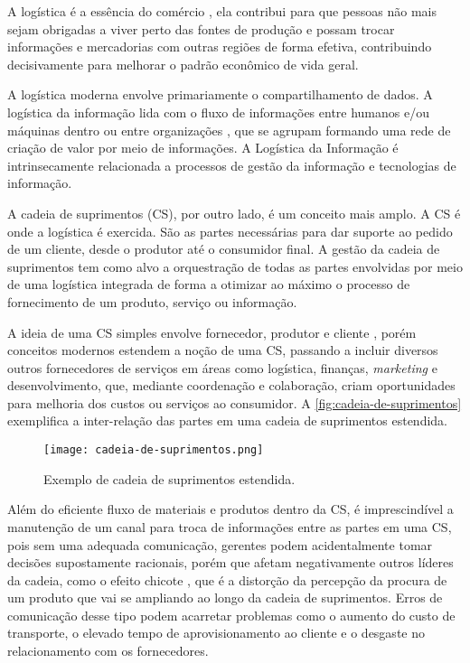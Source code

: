 	A logística é a essência do comércio \cite{ballou2006cadeiasuprimentos}, ela contribui para que pessoas não mais sejam obrigadas a viver perto das fontes de produção e possam trocar informações e mercadorias com outras regiões de forma efetiva, contribuindo decisivamente para melhorar o padrão econômico de vida geral. 
	
	A logística moderna envolve primariamente o compartilhamento de dados. A logística da informação lida com o fluxo de informações entre humanos e/ou máquinas dentro ou entre organizações \cite{haftor2009information}, que se agrupam formando uma rede de criação de valor por meio de informações. A Logística da Informação é intrinsecamente relacionada a processos de gestão da informação e tecnologias de informação.
	
	A cadeia de suprimentos (CS), por outro lado, é um conceito mais amplo. A CS é onde a logística é exercida. São as partes necessárias para dar suporte ao pedido de um cliente, desde o produtor até o consumidor final. A gestão da cadeia de suprimentos tem como alvo a orquestração de todas as partes envolvidas por meio de uma logística integrada de forma a otimizar ao máximo o processo de fornecimento de um produto, serviço ou informação.
	
	A ideia de uma CS simples envolve fornecedor, produtor e cliente \cite{hugos2018supplychain}, porém conceitos modernos estendem a noção de uma CS, passando a incluir diversos outros fornecedores de serviços em áreas como logística, finanças, \textit{marketing} e desenvolvimento, que, mediante coordenação e colaboração, criam oportunidades para melhoria dos custos ou serviços ao consumidor. A \autoref{fig:cadeia-de-suprimentos} exemplifica a inter-relação das partes em uma cadeia de suprimentos estendida.
	
	\begin{figure}[htb]
		\centering
		\label{fig:cadeia-de-suprimentos}
		\texttt{[image: cadeia-de-suprimentos.png]}
		\caption{Exemplo de cadeia de suprimentos estendida.}
	\end{figure}
	
	Além do eficiente fluxo de materiais e produtos dentro da CS, é imprescindível a manutenção de um canal para troca de informações entre as partes em uma CS, pois sem uma adequada comunicação, gerentes podem acidentalmente tomar decisões supostamente racionais, porém que afetam negativamente outros líderes da cadeia, como o efeito chicote \cite{lee1997bullwhip}, que é a distorção da percepção da procura de um produto que vai se ampliando ao longo da cadeia de suprimentos. Erros de comunicação desse tipo podem acarretar problemas como o aumento do custo de transporte, o elevado tempo de aprovisionamento ao cliente e o desgaste no relacionamento com os fornecedores.
	
